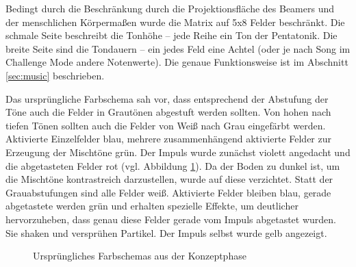 
Bedingt durch die Beschränkung durch die Projektionsfläche des Beamers und der menschlichen Körpermaßen wurde die Matrix auf 5x8 Felder beschränkt. Die schmale Seite beschreibt die Tonhöhe – jede Reihe ein Ton der Pentatonik. Die breite Seite sind die Tondauern – ein jedes Feld eine Achtel (oder je nach Song im Challenge Mode andere Notenwerte). Die genaue Funktionsweise ist im Abschnitt \ref{sec:music} beschrieben.

Das ursprüngliche Farbschema sah vor, dass entsprechend der Abstufung der Töne auch die Felder in Grautönen abgestuft werden sollten. Von hohen nach tiefen Tönen sollten auch die Felder von Weiß nach Grau eingefärbt werden. Aktivierte Einzelfelder blau, mehrere zusammenhängend aktivierte Felder zur Erzeugung der Mischtöne grün. Der Impuls wurde zunächst violett angedacht und die abgetasteten Felder rot (vgl. Abbildung \ref{fig:design}). Da der Boden zu dunkel ist, um die Mischtöne kontrastreich darzustellen, wurde auf diese verzichtet. Statt der Grauabstufungen sind alle Felder weiß. Aktivierte Felder bleiben blau, gerade abgetastete werden grün und erhalten spezielle Effekte, um deutlicher hervorzuheben, dass genau diese Felder gerade vom Impuls abgetastet wurden. Sie shaken und versprühen Partikel. Der Impuls selbst wurde gelb angezeigt.

\begin{figure}[htbp]
\hfill
{}
\caption{Ursprüngliches Farbschemas aus der Konzeptphase}
\label{fig:design}
\end{figure}

